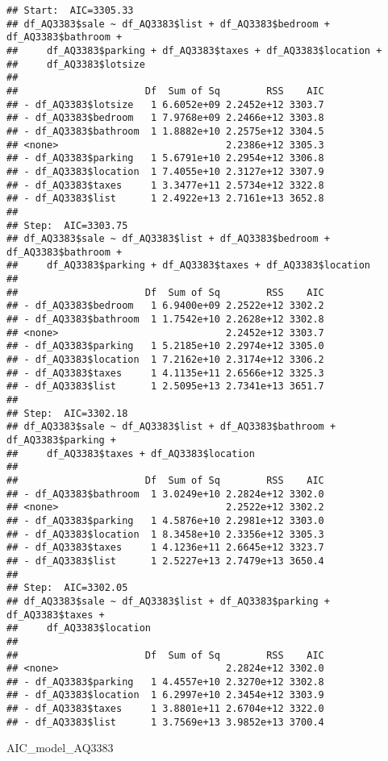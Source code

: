 \documentclass[
]{article}
\newenvironment{Shaded}{\begin{snugshade}}{\end{snugshade}}
\newcommand{\NormalTok}[1]{#1}
\begin{document}
\begin{verbatim}
## Start:  AIC=3305.33
## df_AQ3383$sale ~ df_AQ3383$list + df_AQ3383$bedroom + df_AQ3383$bathroom + 
##     df_AQ3383$parking + df_AQ3383$taxes + df_AQ3383$location + 
##     df_AQ3383$lotsize
## 
##                      Df  Sum of Sq        RSS    AIC
## - df_AQ3383$lotsize   1 6.6052e+09 2.2452e+12 3303.7
## - df_AQ3383$bedroom   1 7.9768e+09 2.2466e+12 3303.8
## - df_AQ3383$bathroom  1 1.8882e+10 2.2575e+12 3304.5
## <none>                             2.2386e+12 3305.3
## - df_AQ3383$parking   1 5.6791e+10 2.2954e+12 3306.8
## - df_AQ3383$location  1 7.4055e+10 2.3127e+12 3307.9
## - df_AQ3383$taxes     1 3.3477e+11 2.5734e+12 3322.8
## - df_AQ3383$list      1 2.4922e+13 2.7161e+13 3652.8
## 
## Step:  AIC=3303.75
## df_AQ3383$sale ~ df_AQ3383$list + df_AQ3383$bedroom + df_AQ3383$bathroom + 
##     df_AQ3383$parking + df_AQ3383$taxes + df_AQ3383$location
## 
##                      Df  Sum of Sq        RSS    AIC
## - df_AQ3383$bedroom   1 6.9400e+09 2.2522e+12 3302.2
## - df_AQ3383$bathroom  1 1.7542e+10 2.2628e+12 3302.8
## <none>                             2.2452e+12 3303.7
## - df_AQ3383$parking   1 5.2185e+10 2.2974e+12 3305.0
## - df_AQ3383$location  1 7.2162e+10 2.3174e+12 3306.2
## - df_AQ3383$taxes     1 4.1135e+11 2.6566e+12 3325.3
## - df_AQ3383$list      1 2.5095e+13 2.7341e+13 3651.7
## 
## Step:  AIC=3302.18
## df_AQ3383$sale ~ df_AQ3383$list + df_AQ3383$bathroom + df_AQ3383$parking + 
##     df_AQ3383$taxes + df_AQ3383$location
## 
##                      Df  Sum of Sq        RSS    AIC
## - df_AQ3383$bathroom  1 3.0249e+10 2.2824e+12 3302.0
## <none>                             2.2522e+12 3302.2
## - df_AQ3383$parking   1 4.5876e+10 2.2981e+12 3303.0
## - df_AQ3383$location  1 8.3458e+10 2.3356e+12 3305.3
## - df_AQ3383$taxes     1 4.1236e+11 2.6645e+12 3323.7
## - df_AQ3383$list      1 2.5227e+13 2.7479e+13 3650.4
## 
## Step:  AIC=3302.05
## df_AQ3383$sale ~ df_AQ3383$list + df_AQ3383$parking + df_AQ3383$taxes + 
##     df_AQ3383$location
## 
##                      Df  Sum of Sq        RSS    AIC
## <none>                             2.2824e+12 3302.0
## - df_AQ3383$parking   1 4.4557e+10 2.3270e+12 3302.8
## - df_AQ3383$location  1 6.2997e+10 2.3454e+12 3303.9
## - df_AQ3383$taxes     1 3.8801e+11 2.6704e+12 3322.0
## - df_AQ3383$list      1 3.7569e+13 3.9852e+13 3700.4
\end{verbatim}

\begin{Shaded}
\begin{Highlighting}[]
\NormalTok{AIC_model_AQ3383}
\end{Highlighting}
\end{Shaded}
\end{document}
